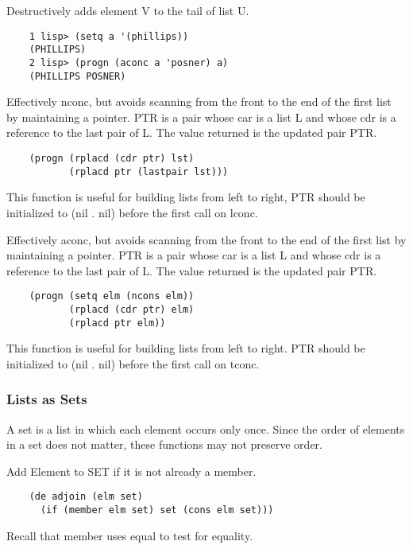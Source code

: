 {    Destructively adds element V to the tail of list U.
}
\begin{verbatim}
    1 lisp> (setq a '(phillips))
    (PHILLIPS)
    2 lisp> (progn (aconc a 'posner) a)
    (PHILLIPS POSNER)
\end{verbatim}

{    Effectively nconc, but avoids scanning from the front to the
    end of the first list by maintaining a pointer.   PTR  is  a
    pair  whose  car is a list L and whose cdr is a reference to
    the last pair of L.  The value returned is the updated  pair
    PTR.
}
\begin{verbatim}
    (progn (rplacd (cdr ptr) lst)
           (rplacd ptr (lastpair lst)))
\end{verbatim}
    This  function  is  useful  for  building lists from left to
    right, PTR should be initialized to (nil . nil)  before  the
    first call on lconc.


{    Effectively aconc, but avoids scanning from the front to the
    end  of  the  first list by maintaining a pointer.  PTR is a
    pair whose car is a list L and whose cdr is a  reference  to
    the  last pair of L.  The value returned is the updated pair
    PTR.
}
\begin{verbatim}
    (progn (setq elm (ncons elm))
           (rplacd (cdr ptr) elm)
           (rplacd ptr elm))
\end{verbatim}
    This function is useful for  building  lists  from  left  to
    right.   PTR should be initialized to (nil . nil) before the
    first call on tconc.

\subsubsection{Lists as Sets}

A set is a list in which each element occurs only once.  Since
the order of elements in a set does not matter, these  functions
may not preserve order.


{    Add Element to SET if it is not already a member.
}
\begin{verbatim}
    (de adjoin (elm set)
      (if (member elm set) set (cons elm set)))
\end{verbatim}
    Recall that member uses equal to test for equality.


